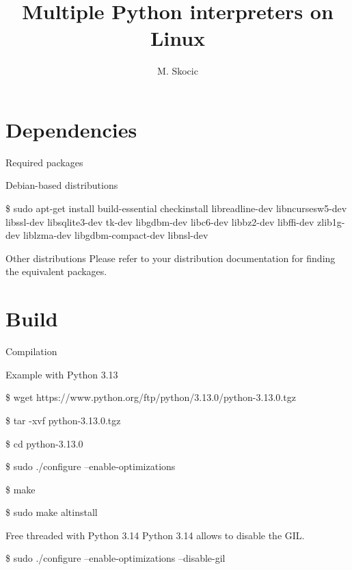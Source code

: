 \documentclass[10pt,compress]{beamer}
\title{Multiple Python interpreters on Linux}
\author{M. Skocic}
\date{}
\begin{document}
\begin{frame}
    \titlepage
\end{frame}

\section{Dependencies}
\begin{frame}{Required packages}
    
    \begin{alertblock}{Debian-based distributions}
        \begin{semiverbatim}
        {\small
        \$ sudo apt-get install build-essential checkinstall
        libreadline-dev libncursesw5-dev libssl-dev 
        libsqlite3-dev tk-dev libgdbm-dev libc6-dev libbz2-dev libffi-dev
        zlib1g-dev liblzma-dev libgdbm-compact-dev libnsl-dev}
        \end{semiverbatim}
    \end{alertblock}

    \begin{alertblock}{Other distributions}
        Please refer to your distribution documentation for finding the 
        equivalent packages.
    \end{alertblock}

\end{frame}


\section{Build}
\begin{frame}{Compilation}
    \begin{alertblock}{Example with Python 3.13}
        \begin{semiverbatim}
            {\small

            \$ wget https://www.python.org/ftp/python/3.13.0/python-3.13.0.tgz
            
            \$ tar -xvf python-3.13.0.tgz
            
            \$ cd python-3.13.0

            \$ sudo ./configure --enable-optimizations

            \$ make

            \$ sudo make altinstall
            }
        \end{semiverbatim}
    \end{alertblock}
    
    \begin{alertblock}{Free threaded with Python 3.14}
        Python 3.14 allows to disable the GIL.
        \begin{semiverbatim}
            {\small

            \$ sudo ./configure --enable-optimizations --disable-gil

            }
        \end{semiverbatim}
    \end{alertblock}
\end{frame}
\end{document}
